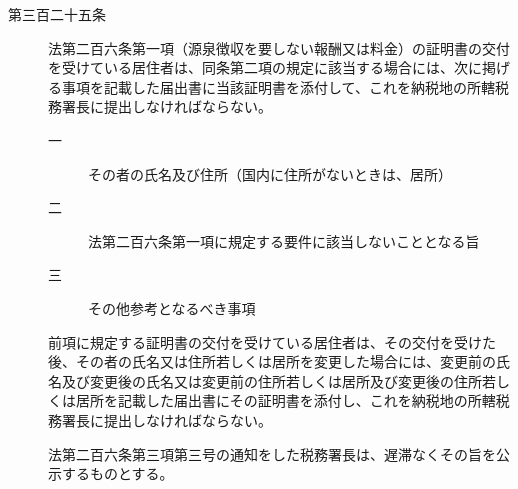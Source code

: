 \documentclass[twocolumn,a4j,10pt]{ltjtarticle}
\begin{document}
\begin{description}
\item[第三百二十五条]法第二百六条第一項（源泉徴収を要しない報酬又は料金）の証明書の交付を受けている居住者は、同条第二項の規定に該当する場合には、次に掲げる事項を記載した届出書に当該証明書を添付して、これを納税地の所轄税務署長に提出しなければならない。
\begin{description}
\item[一]その者の氏名及び住所（国内に住所がないときは、居所）
\item[二]法第二百六条第一項に規定する要件に該当しないこととなる旨
\item[三]その他参考となるべき事項
\end{description}
\item[]前項に規定する証明書の交付を受けている居住者は、その交付を受けた後、その者の氏名又は住所若しくは居所を変更した場合には、変更前の氏名及び変更後の氏名又は変更前の住所若しくは居所及び変更後の住所若しくは居所を記載した届出書にその証明書を添付し、これを納税地の所轄税務署長に提出しなければならない。
\item[]法第二百六条第三項第三号の通知をした税務署長は、遅滞なくその旨を公示するものとする。
\end{description}
\end{document}
